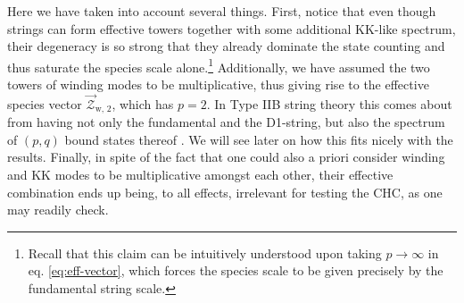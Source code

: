 Here we have taken into account several things. First, notice that even though strings can form effective towers together with some additional KK-like spectrum, their degeneracy is so strong that they already dominate the state counting and thus saturate the species scale alone.\footnote{Recall that this claim can be intuitively understood upon taking $p\to\infty$ in eq. \eqref{eq:eff-vector}, which forces the species scale to be given precisely by the fundamental string scale.} Additionally, we have assumed the two towers of winding modes to be multiplicative, thus giving rise to the effective species vector $\vec{\mathcal{Z}}_{\text{w}, \,2}$, which has $p=2$. In Type IIB string theory this comes about from having not only the fundamental and the D1-string, but also the spectrum of $(p,q)$ bound states thereof \cite{Witten:1995im}. We will see later on how this fits nicely with the results. Finally, in spite of the fact that one could also a priori consider winding and KK modes to be multiplicative amongst each other, their effective combination ends up being, to all effects, irrelevant for testing the CHC, as one may readily check.

